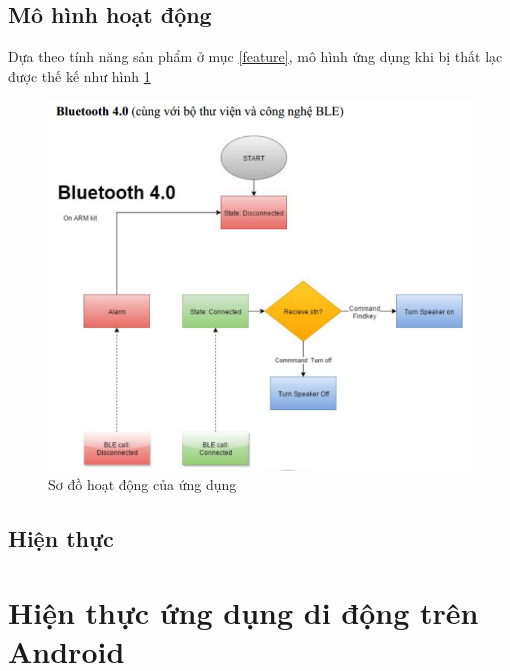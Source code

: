 \subsection{Mô hình hoạt động}
Dựa theo tính năng sản phẩm ở mục \ref{feature}, mô hình ứng dụng khi bị thất lạc được thế kế như hình \ref{fig: ble}
	\begin{figure}[h]
		\centering    
		\includegraphics[width=1.0\textwidth]{ble}
		\caption[Sơ đồ hoạt động trên sản phẩm]{Sơ đồ hoạt động của ứng dụng}
		\label{fig: ble}
	\end{figure}
\subsection{Hiện thực}
\newpage
\section{Hiện thực ứng dụng di động trên Android}
